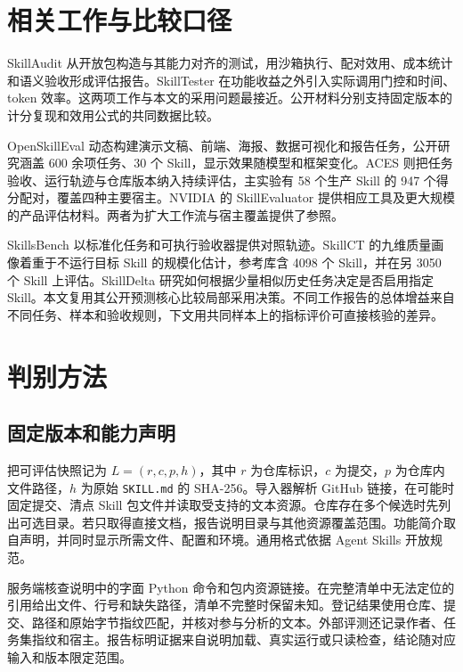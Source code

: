 \documentclass[final,5p,twocolumn,10pt]{elsarticle}
\newcommand{\code}[1]{\texttt{#1}}
\begin{document}
\section{相关工作与比较口径}

SkillAudit 从开放包构造与其能力对齐的测试，用沙箱执行、配对效用、成本统计和语义验收形成评估报告\cite{audit,portrait}。SkillTester 在功能收益之外引入实际调用门控和时间、token 效率\cite{tester,testerspec}。这两项工作与本文的采用问题最接近。公开材料分别支持固定版本的计分复现和效用公式的共同数据比较。

OpenSkillEval 动态构建演示文稿、前端、海报、数据可视化和报告任务，公开研究涵盖 600 余项任务、30 个 Skill，显示效果随模型和框架变化\cite{open}。ACES 则把任务验收、运行轨迹与仓库版本纳入持续评估，主实验有 58 个生产 Skill 的 947 个得分配对，覆盖四种主要宿主\cite{aces}。NVIDIA 的 SkillEvaluator 提供相应工具及更大规模的产品评估材料\cite{nvidia}。两者为扩大工作流与宿主覆盖提供了参照。

SkillsBench 以标准化任务和可执行验收器提供对照轨迹\cite{skillsbench,archive}。SkillCT 的九维质量画像着重于不运行目标 Skill 的规模化估计，参考库含 4098 个 Skill，并在另 3050 个 Skill 上评估\cite{skillct}。SkillDelta 研究如何根据少量相似历史任务决定是否启用指定 Skill\cite{delta,deltacode}。本文复用其公开预测核心比较局部采用决策。不同工作报告的总体增益来自不同任务、样本和验收规则，下文用共同样本上的指标评价可直接核验的差异。

\section{判别方法}

\subsection{固定版本和能力声明}

把可评估快照记为 $L=(r,c,p,h)$，其中 $r$ 为仓库标识，$c$ 为提交，$p$ 为仓库内文件路径，$h$ 为原始 \code{SKILL.md} 的 SHA-256。导入器解析 GitHub 链接，在可能时固定提交、清点 Skill 包文件并读取受支持的文本资源。仓库存在多个候选时先列出可选目录。若只取得直接文档，报告说明目录与其他资源覆盖范围。功能简介取自声明，并同时显示所需文件、配置和环境。通用格式依据 Agent Skills 开放规范\cite{spec}。

服务端核查说明中的字面 Python 命令和包内资源链接。在完整清单中无法定位的引用给出文件、行号和缺失路径，清单不完整时保留未知。登记结果使用仓库、提交、路径和原始字节指纹匹配，并核对参与分析的文本。外部评测还记录作者、任务集指纹和宿主。报告标明证据来自说明加载、真实运行或只读检查，结论随对应输入和版本限定范围。
\end{document}
